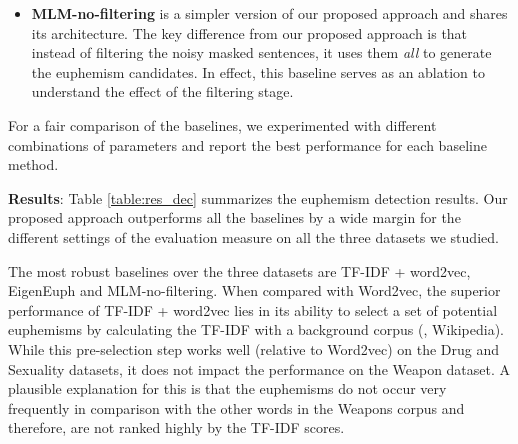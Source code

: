 \begin{itemize}
	\item \textbf{MLM-no-filtering} is a simpler version of our 
	proposed approach and shares its architecture. The key difference from our proposed approach is that instead of filtering the noisy masked sentences, it uses them \textit{all} to generate the euphemism candidates. In effect, this baseline serves as an ablation to understand the effect of the filtering stage. 
\end{itemize}

For a fair comparison of the baselines, we experimented with different combinations of parameters and report the best performance for each baseline method. 

\noindent \textbf{Results}: 
Table \ref{table:res_dec} summarizes the euphemism detection results. 
Our proposed approach outperforms all the baselines by a wide margin for the different settings of the  evaluation measure on all the three datasets we studied. 

The most robust baselines over the three datasets are TF-IDF + word2vec, EigenEuph  and MLM-no-filtering. 
When compared with Word2vec, the superior performance of TF-IDF + word2vec lies in its ability to select a set of potential euphemisms  by calculating the TF-IDF with a background corpus (\ie, Wikipedia). 
While this pre-selection step works well (relative to Word2vec) on the Drug and Sexuality datasets, it does not impact the performance on the Weapon dataset. A plausible explanation for this is that the euphemisms do not occur very frequently in comparison with the other words in the Weapons corpus and therefore, are not ranked highly by the TF-IDF scores. 


